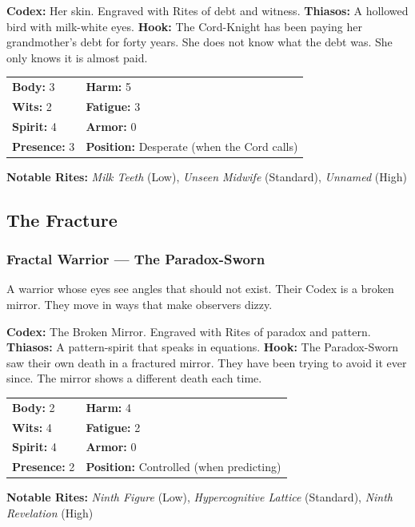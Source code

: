 \textbf{Codex:} Her skin. Engraved with Rites of debt and witness.
\textbf{Thiasos:} A hollowed bird with milk-white eyes.
\textbf{Hook:} The Cord-Knight has been paying her grandmother's debt for forty years. She does not know what the debt was. She only knows it is almost paid.

\begin{tabular}{ll}
\textbf{Body:} 3 & \textbf{Harm:} 5 \\
\textbf{Wits:} 2 & \textbf{Fatigue:} 3 \\
\textbf{Spirit:} 4 & \textbf{Armor:} 0 \\
\textbf{Presence:} 3 & \textbf{Position:} Desperate (when the Cord calls) \\
\end{tabular}

\textbf{Notable Rites:} \textit{Milk Teeth} (Low), \textit{Unseen Midwife} (Standard), \textit{Unnamed} (High)

\subsection{The Fracture}

\subsubsection{Fractal Warrior — The Paradox-Sworn}

A warrior whose eyes see angles that should not exist. Their Codex is a broken mirror. They move in ways that make observers dizzy.

\textbf{Codex:} The Broken Mirror. Engraved with Rites of paradox and pattern.
\textbf{Thiasos:} A pattern-spirit that speaks in equations.
\textbf{Hook:} The Paradox-Sworn saw their own death in a fractured mirror. They have been trying to avoid it ever since. The mirror shows a different death each time.

\begin{tabular}{ll}
\textbf{Body:} 2 & \textbf{Harm:} 4 \\
\textbf{Wits:} 4 & \textbf{Fatigue:} 2 \\
\textbf{Spirit:} 4 & \textbf{Armor:} 0 \\
\textbf{Presence:} 2 & \textbf{Position:} Controlled (when predicting) \\
\end{tabular}

\textbf{Notable Rites:} \textit{Ninth Figure} (Low), \textit{Hypercognitive Lattice} (Standard), \textit{Ninth Revelation} (High)

